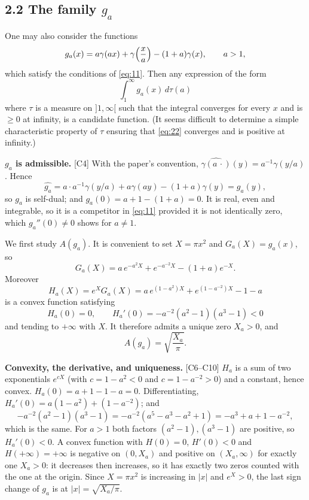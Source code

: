 \documentclass[11pt,reqno]{amsart}
\theoremstyle{plain}
\theoremstyle{definition}
\theoremstyle{remark}
\newcommand{\Ledger}[1]{{\scriptsize\textsf{[#1]}}}
\begin{document}
\subsection*{2.2 The family $g_a$}

One may also consider the functions
\begin{equation}\label{eq:21}
 g_a(x)=a\gamma(ax)+\gamma\Bigl(\frac xa\Bigr)-(1+a)\gamma(x),\qquad a>1,
\end{equation}
which satisfy the conditions of \eqref{eq:11}. Then any expression of the form
\begin{equation}\label{eq:22}
 \int_1^\infty g_a(x)\,d\tau(a)
\end{equation}
where $\tau$ is a measure on $]1,\infty[$ such that the integral converges for every
$x$ and is $\ge0$ at infinity, is a candidate function. (It seems difficult to
determine a simple characteristic property of $\tau$ ensuring that \eqref{eq:22}
converges and is positive at infinity.)

\begin{expansion}
\textbf{$g_a$ is admissible.} \Ledger{C4} With the paper's convention,
$\widehat{\gamma(a\,\cdot)}(y)=a^{-1}\gamma(y/a)$. Hence
\[\widehat{g_a}=a\cdot a^{-1}\gamma(y/a)+a\gamma(ay)-(1+a)\gamma(y)=g_a(y),\]
so $g_a$ is self-dual; and $g_a(0)=a+1-(1+a)=0$. It is real, even and integrable, so
it is a competitor in \eqref{eq:11} provided it is not identically zero, which
$g_a''(0)\ne0$ shows for $a\ne1$.
\end{expansion}

We first study $A(g_a)$. It is convenient to set $X=\pi x^2$ and $G_a(X)=g_a(x)$, so
\[G_a(X)=a\,e^{-a^2X}+e^{-a^{-2}X}-(1+a)e^{-X} .\]
Moreover
\begin{equation}\label{eq:23}
 H_a(X)=e^XG_a(X)=a\,e^{(1-a^2)X}+e^{(1-a^{-2})X}-1-a
\end{equation}
is a convex function satisfying
\[H_a(0)=0,\qquad H_a'(0)=-a^{-2}(a^2-1)(a^3-1)<0\]
and tending to $+\infty$ with $X$. It therefore admits a unique zero $X_a>0$, and
\[A(g_a)=\sqrt{\frac{X_a}{\pi}} .\]

\begin{expansion}
\textbf{Convexity, the derivative, and uniqueness.} \Ledger{C6--C10}
$H_a$ is a sum of two exponentials $e^{cX}$ (with $c=1-a^2<0$ and $c=1-a^{-2}>0$) and
a constant, hence convex. $H_a(0)=a+1-1-a=0$. Differentiating,
$H_a'(0)=a(1-a^2)+(1-a^{-2})$; and
\[-a^{-2}(a^2-1)(a^3-1)=-a^{-2}(a^5-a^3-a^2+1)=-a^3+a+1-a^{-2},\]
which is the same. For $a>1$ both factors $(a^2-1),(a^3-1)$ are positive, so
$H_a'(0)<0$. A convex function with $H(0)=0$, $H'(0)<0$ and $H(+\infty)=+\infty$ is
negative on $(0,X_a)$ and positive on $(X_a,\infty)$ for exactly one $X_a>0$: it
decreases then increases, so it has exactly two zeros counted with the one at the
origin. Since $X=\pi x^2$ is increasing in $|x|$ and $e^X>0$, the last sign change of
$g_a$ is at $|x|=\sqrt{X_a/\pi}$.
\end{expansion}
\end{document}
